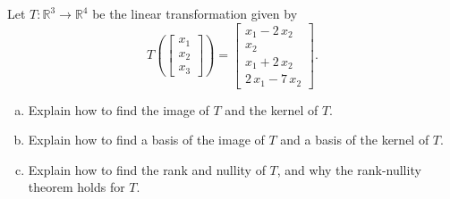 
\begin{exerciseStatement}
 Let \(T:\mathbb{R}^ 3  \to \mathbb{R}^ 4 \) be the linear transformation given by \[T\left(  \left[\begin{array}{c}
x_{1} \\
x_{2} \\
x_{3}
\end{array}\right]  \right) =  \left[\begin{array}{c}
x_{1} - 2 \, x_{2} \\
x_{2} \\
x_{1} + 2 \, x_{2} \\
2 \, x_{1} - 7 \, x_{2}
\end{array}\right] .\]
\begin{enumerate}[(a)]
\item Explain how to find the image of \(T\) and the kernel of \(T\).
\item Explain how to find a basis of the image of \(T\) and a basis of the kernel of \(T\).
\item Explain how to find the rank and nullity of \(T\), and why the rank-nullity theorem holds for \(T\).
\end{enumerate}
    
\end{exerciseStatement}
    

